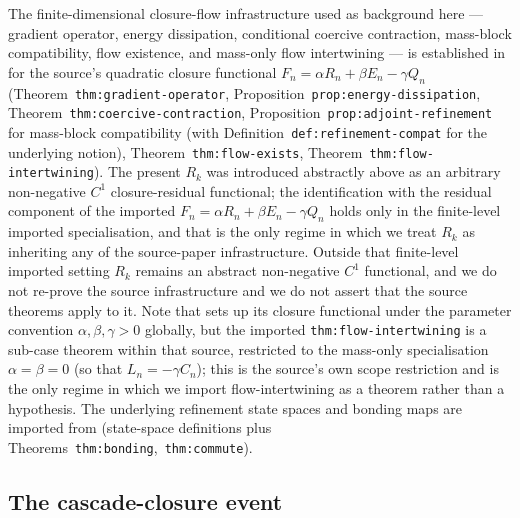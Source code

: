\documentclass[11pt]{article}
\theoremstyle{definition}
\begin{document}
The finite-dimensional closure-flow infrastructure used as background
here --- gradient operator, energy dissipation, conditional coercive
contraction, mass-block compatibility, flow existence, and mass-only
flow intertwining --- is established in \cite{CascadeClosureDynamics}
for the source's quadratic closure functional
$F_n = \alpha R_n + \beta E_n - \gamma Q_n$
(Theorem~\texttt{thm:gradient-operator}, Proposition~\texttt{prop:energy-dissipation},
Theorem~\texttt{thm:coercive-contraction},
Proposition~\texttt{prop:adjoint-refinement} for mass-block
compatibility (with Definition~\texttt{def:refinement-compat} for the
underlying notion), Theorem~\texttt{thm:flow-exists},
Theorem~\texttt{thm:flow-intertwining}).
The present $R_k$ was introduced abstractly above as an arbitrary
non-negative $C^1$ closure-residual functional; the identification
with the residual component of the imported $F_n = \alpha R_n + \beta
E_n - \gamma Q_n$ holds only in the finite-level imported
specialisation, and that is the only regime in which we treat
$R_k$ as inheriting any of the source-paper infrastructure. Outside
that finite-level imported setting $R_k$ remains an abstract
non-negative $C^1$ functional, and we do not re-prove the source
infrastructure and we do not assert that the source theorems apply
to it. Note that
\cite{CascadeClosureDynamics} sets up its closure functional under the
parameter convention $\alpha, \beta, \gamma > 0$ globally, but the
imported \texttt{thm:flow-intertwining} is a sub-case theorem within
that source, restricted to the mass-only specialisation
$\alpha = \beta = 0$ (so that $L_n = -\gamma C_n$); this is the
source's own scope restriction and is the only regime in which we
import flow-intertwining as a theorem rather than a hypothesis. The underlying refinement state
spaces and bonding maps are imported from
\cite{CascadeRefinementSpaces}
(state-space definitions plus
Theorems~\texttt{thm:bonding},~\texttt{thm:commute}).

\subsection{The cascade-closure event}
\end{document}
